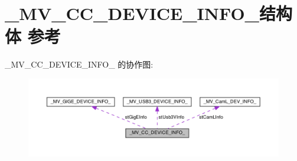\hypertarget{struct___m_v___c_c___d_e_v_i_c_e___i_n_f_o__}{}\section{\+\_\+\+M\+V\+\_\+\+C\+C\+\_\+\+D\+E\+V\+I\+C\+E\+\_\+\+I\+N\+F\+O\+\_\+结构体 参考}
\label{struct___m_v___c_c___d_e_v_i_c_e___i_n_f_o__}


\+\_\+\+M\+V\+\_\+\+C\+C\+\_\+\+D\+E\+V\+I\+C\+E\+\_\+\+I\+N\+F\+O\+\_\+ 的协作图\+:\nopagebreak
\begin{figure}[H]
\begin{center}
\leavevmode
\includegraphics[width=350pt]{struct___m_v___c_c___d_e_v_i_c_e___i_n_f_o____coll__graph}
\end{center}
\end{figure}

